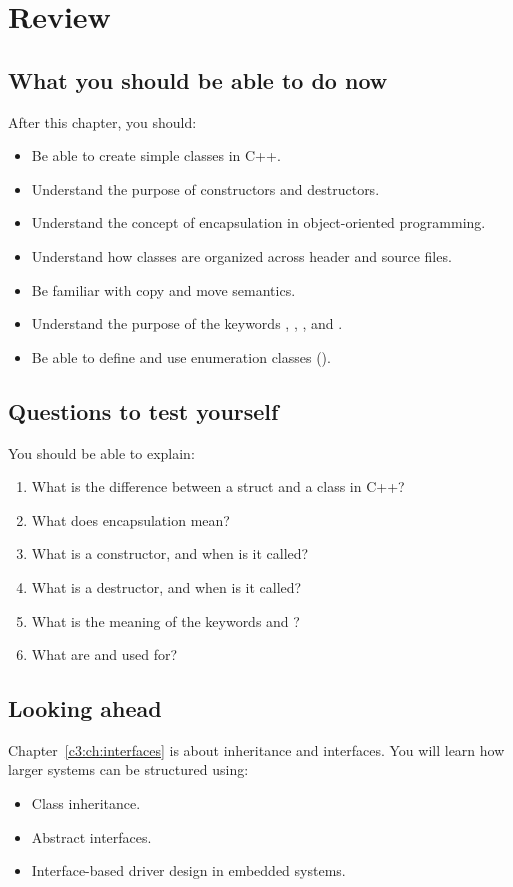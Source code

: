 
\section{Review}
\label{c2:sec:review}

\subsection*{What you should be able to do now}
After this chapter, you should:
\begin{itemize}
  \item Be able to create simple classes in C++.
  \item Understand the purpose of constructors and destructors.
  \item Understand the concept of encapsulation in object-oriented programming.
  \item Understand how classes are organized across header and source files.
  \item Be familiar with copy and move semantics.
  \item Understand the purpose of the keywords , , , and
    .
  \item Be able to define and use enumeration classes ().
\end{itemize}

\subsection*{Questions to test yourself}
You should be able to explain:
\begin{enumerate}
  \item What is the difference between a struct and a class in C++?
  \item What does encapsulation mean?
  \item What is a constructor, and when is it called?
  \item What is a destructor, and when is it called?
  \item What is the meaning of the keywords  and ?
  \item What are  and  used for?
\end{enumerate}

\subsection*{Looking ahead}
Chapter~\ref{c3:ch:interfaces} is about inheritance and interfaces. You will learn how larger
systems can be structured using:
\begin{itemize}
  \item Class inheritance.
  \item Abstract interfaces.
  \item Interface-based driver design in embedded systems.
\end{itemize}

